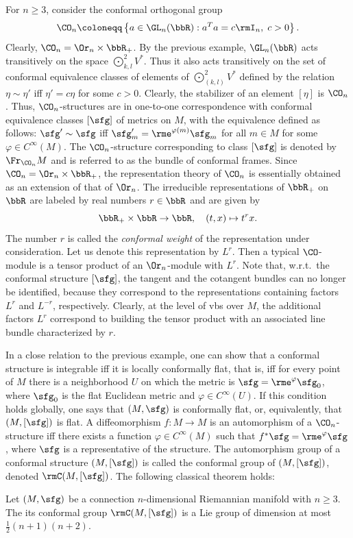 \begin{example}
    For $n\geq 3$, consider the conformal orthogonal group 
    \[\CO_n\coloneqq \left\{a\in\GL_n(\bbR):a^Ta=c\rmI_n,\; c>0\right\}.\]
    Clearly, $\CO_n=\Or_n\times\bbR_+$. By the previous example, $\GL_n(\bbR)$ acts transitively on the space $\bigodot\nolimits^2_{k,l}V^\ast$. Thus it also acts transitively on the set of conformal equivalence classes of elements of $\bigodot\nolimits^2_{(k,l)}V^\ast$ defined by the relation $\eta\sim\eta'$ iff $\eta'=c\eta$ for some $c>0$. Clearly, the stabilizer of an element $[\eta]$ is $\CO_n$. Thus, $\CO_n$-structures are in one-to-one correspondence with conformal equivalence classes $[\sfg]$ of metrics on $M$, with the equivalence defined as follows: $\sfg'\sim\sfg$ iff $\sfg'_m=\rme^{\varphi(m)}\sfg_m$ for all $m\in M$ for some $\varphi\in C^\infty(M)$. The $\CO_n$-structure corresponding to class $[\sfg]$ is denoted by $\Fr_{\CO_n}M$ and is referred to as the bundle of conformal frames.
    Since $\CO_n=\Or_n\times\bbR_+$, the representation theory of $\CO_n$ is essentially obtained as an extension of that of $\Or_n$. The irreducible representations of $\bbR_+$ on $\bbR$ are labeled by real numbers $r\in\bbR$ and are given by 
    \[\bbR_+\times\bbR\to \bbR,\quad (t,x)\mapsto t^r x.\]
    The number $r$ is called the \emph{conformal weight} of the representation under consideration. Let us denote this representation by $L^r$. Then a typical $\CO$-module is a tensor product of an $\Or_n$-module with $L^r$. Note that, w.r.t.\ the conformal structure $[\sfg]$, the tangent and the cotangent bundles can no longer be identified, because they correspond to the representations containing factors $L^r$ and $L^{-r}$, respectively. Clearly, at the level of \glspl{vb} over $M$, the additional factors $L^r$ correspond to building the tensor product with an associated line bundle characterized by $r$.

    In a close relation to the previous example, one can show that a conformal structure is integrable iff it is locally conformally flat, that is, iff for every point of $M$ there is a neighborhood $U$ on which the metric is $\sfg=\rme^{\varphi}\sfg_0$, where $\sfg_0$ is the flat Euclidean metric and $\varphi\in C^\infty(U)$. If this condition holds globally, one says that $(M,\sfg)$ is conformally flat, or, equivalently, that $(M,[\sfg])$ is flat. A diffeomorphism $f:M\to M$ is an automorphism of a $\CO_n$-structure iff there exists a function $\varphi\in C^\infty(M)$ such that $f^\ast\sfg=\rme^\varphi \sfg$, where $\sfg$ is a representative of the structure. The automorphism group of a conformal structure $(M,[\sfg])$ is called the conformal group of $(M,[\sfg])$, denoted $\rmC(M,[\sfg])$. The following classical theorem holds: 
    \begin{thm}\label{thm Liouville conformal}
        Let $(M,\sfg)$ be a connection $n$-dimensional Riemannian manifold with $n\geq 3$. The its conformal group $\rmC(M,[\sfg])$ is a Lie group of dimension at most $\frac12(n+1)(n+2)$.
    \end{thm}
\end{example}
